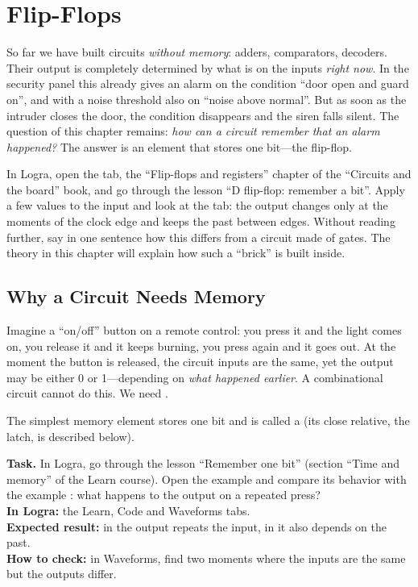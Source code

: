 \chapter{Flip-Flops}
\label{ch:ff}

So far we have built circuits \emph{without memory}: adders, comparators,
decoders. Their output is completely determined by what is on the inputs
\emph{right now}. In the security panel this already gives an alarm on the
condition ``door open and guard on'', and with a noise threshold also on
``noise above normal''. But as soon as the intruder closes the door, the
condition disappears and the siren falls silent. The question of this chapter
remains: \emph{how can a circuit remember that an alarm happened?} The answer
is an element that stores one bit---the flip-flop.

\begin{buildbox}
In Logra, open the  tab, the ``Flip-flops and registers'' chapter
of the ``Circuits and the board'' book, and go through the lesson ``D flip-flop:
remember a bit''. Apply a few values to the input and look at the
 tab: the output changes only at the moments of the clock edge
and keeps the past between edges. Without reading further, say in one sentence
how this differs from a circuit made of gates. The theory in this chapter will
explain how such a ``brick'' is built inside.
\end{buildbox}

\section{Why a Circuit Needs Memory}

Imagine a ``on/off'' button on a remote control: you press it and the light
comes on, you release it and it keeps burning, you press again and it goes
out. At the moment the button is released, the circuit inputs are the same, yet
the output may be either 0 or 1---depending on \emph{what happened earlier}. A
combinational circuit cannot do this. We need .

The simplest memory element stores one bit and is called a 
(its close relative, the latch, is described below).

\begin{diybox}
\textbf{Task.}  In Logra, go through the lesson ``Remember one bit''
(section ``Time and memory'' of the Learn course).  Open the example
 and compare its behavior with the example : what
happens to the output on a repeated press?\\
\textbf{In Logra:} the Learn, Code and Waveforms tabs.\\
\textbf{Expected result:} in  the output repeats the input,
in  it also depends on the past.\\
\textbf{How to check:} in Waveforms, find two moments where the inputs are the
same but the outputs differ.
\end{diybox}

